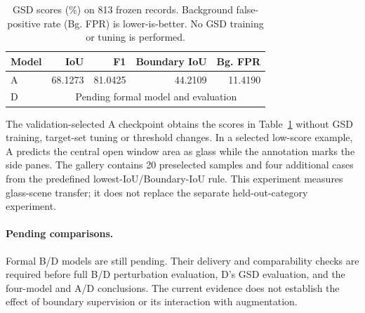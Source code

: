 \begin{table}[t]
\centering
\small
\setlength{\tabcolsep}{3pt}
\begin{tabular}{lrrrr}
\hline
Model & IoU & F1 & Boundary IoU & Bg. FPR \\
\hline
A & 68.1273 & 81.0425 & 44.2109 & 11.4190 \\
D & \multicolumn{4}{c}{Pending formal model and evaluation} \\
\hline
\end{tabular}
\caption{GSD scores (\%) on 813 frozen records. Background false-positive
rate (Bg. FPR) is lower-is-better. No GSD training or tuning is performed.}
\label{tab:member4-gsd}
\end{table}

The validation-selected A checkpoint obtains the scores in
Table~\ref{tab:member4-gsd} without GSD training, target-set tuning or threshold
changes. In a selected low-score example, A predicts the central open window
area as glass while the annotation marks the side panes. The gallery contains
20 preselected samples and four additional cases from the predefined
lowest-IoU/Boundary-IoU rule. This experiment measures glass-scene transfer;
it does not replace the separate held-out-category experiment.

\paragraph{Pending comparisons.}
Formal B/D models are still pending. Their delivery and comparability checks
are required before full B/D perturbation evaluation, D's GSD evaluation,
and the four-model and A/D conclusions. The current evidence does not
establish the effect of boundary supervision or its interaction with augmentation.

